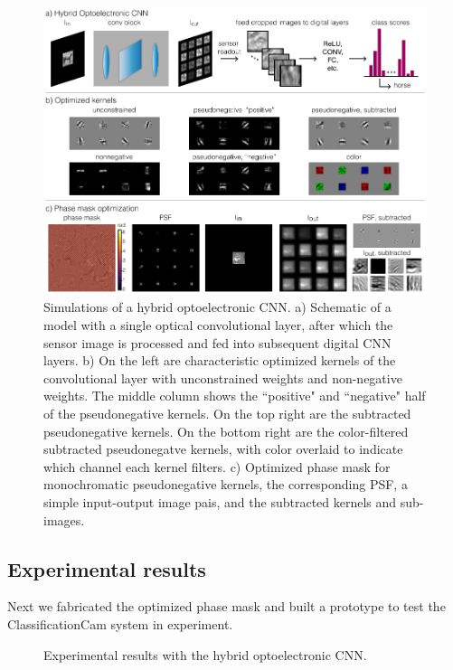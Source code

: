 \documentclass[fleqn,10pt]{wlscirep}
\begin{document}
\begin{figure}[ht]
\centering
\includegraphics[width=\linewidth]{hybrid.pdf}
\caption{Simulations of a hybrid optoelectronic CNN. a) Schematic of a model with a single optical convolutional layer, after which the sensor image is processed and fed into subsequent digital CNN layers. b) On the left are characteristic optimized kernels of the convolutional layer with unconstrained weights and non-negative weights. The middle column shows the ``positive" and ``negative" half of the pseudonegative kernels. On the top right are the subtracted pseudonegative kernels. On the bottom right are the color-filtered subtracted pseudonegatve kernels, with color overlaid to indicate which channel each kernel filters. c) Optimized phase mask for monochromatic pseudonegative kernels, the corresponding PSF, a simple input-output image pais, and the subtracted kernels and sub-images.}
\label{fig:hybrid}
\end{figure}



\subsection*{Experimental results}
Next we fabricated the optimized phase mask and built a prototype to test the ClassificationCam system in experiment. 

\begin{figure}[t]
\centering
\caption{Experimental results with the hybrid optoelectronic CNN.}
\label{fig:experiment}
\end{figure}
\end{document}
